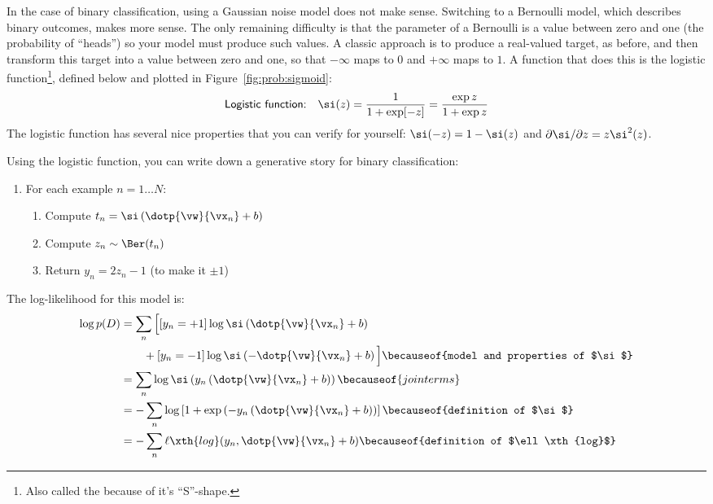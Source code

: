 In the case of binary classification, using a Gaussian noise model
does not make sense.  Switching to a Bernoulli model, which describes
binary outcomes, makes more sense.  The only remaining difficulty is
that the parameter of a Bernoulli is a value between zero and one (the
probability of ``heads'') so your model must produce such values.  A
classic approach is to produce a real-valued target, as before, and
then transform this target into a value between zero and one, so that
$-\infty$ maps to $0$ and $+\infty$ maps to $1$.  A function that does
this is the logistic function\footnote{Also called the
   because of it's ``S''-shape.}, defined
below and plotted in Figure~\ref{fig:prob:sigmoid}:
%
%
\begin{equation}
\textsf{Logistic function:} \quad
\si(z) = \frac 1 {1 + \exp[-z]} = \frac {\exp z}{1 + \exp z}
\end{equation}
%
The logistic function has several nice properties that you can verify
for yourself: $\si(-z) = 1 - \si(z)$ and $\partial \si/\partial z = z
\si^2(z)$.

Using the logistic function, you can write down a generative story for
binary classification:

\begin{enumerate}
  \item For each example $n=1 \dots N$:
    \begin{enumerate}
      \item Compute $t_n = \si\left(\dotp{\vw}{\vx_n} + b\right)$
      \item Compute $z_n \sim \Ber(t_n)$
      \item Return $y_n = 2 z_n - 1$ (to make it $\pm 1$)
    \end{enumerate}
\end{enumerate}

The log-likelihood for this model is:
%
\begin{align}
   \log p(D)
&= \sum_n \Big[ [y_n=+1] \log \si\left(\dotp{\vw}{\vx_n} + b\right)\nonumber\\
&\qquad
               + [y_n=-1] \log \si\left(-\dotp{\vw}{\vx_n} + b\right)
            \Big]
   \becauseof{model and properties of $\si$}\\
&= \sum_n \log \si\left( y_n \left(\dotp{\vw}{\vx_n} + b\right)\right)
   \becauseof{join terms} \\
&= - \sum_n \log \left[ 1 + \exp\left( - y_n \left(\dotp{\vw}{\vx_n} +
      b\right)\right) \right]
    \becauseof{definition of $\si$}\\
&= - \sum_n \ell\xth{log}(y_n, \dotp{\vw}{\vx_n} + b)
    \becauseof{definition of $\ell\xth{log}$}
\end{align}

